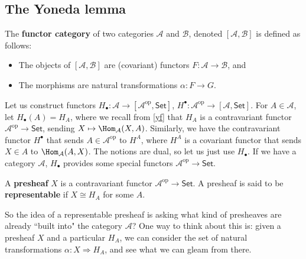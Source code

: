 \subsection{The Yoneda lemma}
\begin{definition}
    The \textbf{functor category} of two categories $\mathcal{A} $ and $\mathcal{B} $, denoted $[\mathcal{A} ,\mathcal{B} ]$ is defined as follows:
    \begin{itemize}
    \setlength\itemsep{-.2em}
        \item The objects of $[\mathcal{A} ,\mathcal{B} ]$ are (covariant) functors $F \colon \mathcal{A}  \to \mathcal{B} $, and 
        \item The morphisms are natural transformations $\alpha \colon F \to G$.
    \end{itemize}
\end{definition}
Let us construct functors $H_{\bullet} \colon \mathcal{A}  \to [\mathcal{A} ^{\mathrm{op}},\mathsf{Set} ]$, $H^{\bullet}\colon \mathcal{A} ^{\mathrm{op}} \to [\mathcal{A} , \mathsf{Set} ]$. For $A \in \mathcal{A} $, let $H_{\bullet}(A)=H_A$, where we recall from \cref{yf} that $H_A$ is a contravariant functor  $\mathcal{A} ^{\mathrm{op}} \to \mathsf{Set} $, sending $X \mapsto \Hom _{\mathcal{A} }(X,A)$. Similarly, we have the contravariant functor $H^{\bullet}$ that sends $A \in \mathcal{A} ^{\mathrm{op}}$ to $H^A$, where $H^A$ is a covariant functor that sends $X \in A$ to $\Hom_{ \mathcal{A} }(A,X)$. The notions are dual, so let us just use $H_{\bullet}$.
If we have a category $\mathcal{A} $, $H_{\bullet}$ provides some special functors $\mathcal{A} ^{\mathrm{op}}\to \mathsf{Set} $.


\begin{definition}[]
    A \textbf{presheaf} $X$ is a contravariant functor $\mathcal{A} ^{\mathrm{op}}\to  \mathsf{Set} $. A presheaf is said to be \textbf{representable} if $X \cong H_A$ for some $A$.
\end{definition}
So the idea of a representable presheaf is asking what kind of presheaves are already ``built into" the category $\mathcal{A} $? One way to think about this is: given a presheaf $X$ and a particular $H_A$, we can consider the set of natural transformations $\alpha  \colon X \Rightarrow H_A$, and see what we can gleam from there. 

